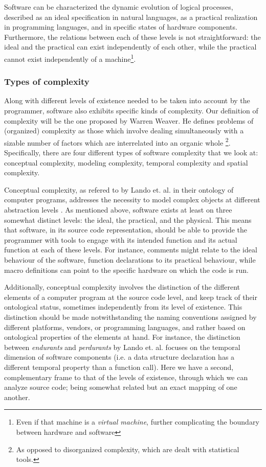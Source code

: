 Software can be characterized the dynamic evolution of logical processes, described as an ideal specification in natural languages, as a practical realization in programming languages, and in specific states of hardware components. Furthermore, the relations between each of these levels is not straightforward: the ideal and the practical can exist independently of each other, while the practical cannot exist independently of a machine\footnote{Even if that machine is a \emph{virtual machine}, further complicating the boundary between hardware and software}.

\subsubsection{Types of complexity} %

Along with different levels of existence needed to be taken into account by the programmer, software also exhibits specific kinds of complexity. Our definition of complexity will be the one proposed by Warren Weaver. He defines problems of (organized) complexity as those which involve dealing simultaneously with a sizable number of factors which are interrelated into an organic whole \citep{weaver_science_1948}\footnote{As opposed to disorganized complexity, which are dealt with statistical tools.}. Specifically, there are four different types of software complexity that we look at: conceptual complexity, modeling complexity, temporal complexity and spatial complexity.

Conceptual complexity, as refered to by Lando et. al. in their ontology of computer programs, addresses the necessity to model complex objects at different abstraction levels \citep{lando_general_2007}. As mentioned above, software exists at least on three somewhat distinct levels: the ideal, the practical, and the physical. This means that software, in its source code representation, should be able to provide the programmer with tools to engage with its intended function and its actual function at each of these levels. For instance, comments might relate to the ideal behaviour of the software, function declarations to its practical behaviour, while macro definitions can point to the specific hardware on which the code is run.


Additionally, conceptual complexity involves the distinction of the different elements of a computer program at the source code level, and keep track of their ontological status, sometimes independently from its level of existence. This distinction should be made notwithstanding the naming conventions assigned by different platforms, vendors, or programming languages, and rather based on ontological properties of the elements at hand. For instance, the distinction between \emph{endurants} and \emph{perdurants} by Lando et. al. focuses on the temporal dimension of software components (i.e. a data structure declaration has a different temporal property than a function call). Here we have a second, complementary frame to that of the levels of existence, through which we can analyze source code; being somewhat related but an exact mapping of one another.

